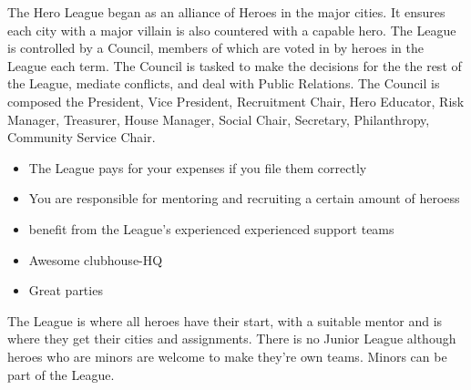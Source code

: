 \documentclass[blue]{LRSguildcamp1}
\begin{document}
\name{\bHeroLeague{}}


The Hero League began as an alliance of Heroes in the major cities. It ensures each city with a major villain is also countered with a capable hero. The League is controlled by a Council, members of which are voted in by heroes in the League each term. The Council is tasked to make the decisions for the the rest of the League, mediate conflicts, and deal with Public Relations. The Council is composed the President, Vice President, Recruitment Chair, Hero Educator, Risk Manager, Treasurer, House Manager, Social Chair, Secretary, Philanthropy, Community Service Chair. 

\begin{itemize}
\item The League pays for your expenses if you file them correctly 
\item You are responsible for mentoring and recruiting a certain amount of heroess
\item benefit from the League's experienced experienced support teams
\item Awesome clubhouse-HQ
\item Great parties
\end{itemize}

The League is where all heroes have their start, with a suitable mentor and is where they get their cities and assignments. There is no Junior League although heroes who are minors are welcome to make they're own teams. Minors can be part of the League. 
\end{document}
